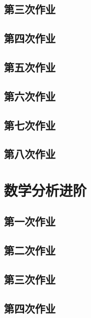 \documentclass[
	leqno, %
	a4paper, %
	fontsize=12pt, %
	twoside=false, %
	open=any, %
	chapterentrydots=true, %
	numbers=noenddot, %
    UTF-8, %
	toc=nottotoc,
	BCOR=12mm,
	DIV=calc,
]{styles/kaobook}
\begin{document}
\section{第三次作业}

\section{第四次作业}

\section{第五次作业}

\section{第六次作业}

\section{第七次作业}

\section{第八次作业}


\setchapterpreamble[u]{\margintoc}
\chapter{数学分析进阶}
% 
% 
\section{第一次作业}

\section{第二次作业}

\section{第三次作业}

\section{第四次作业}

\end{document}
